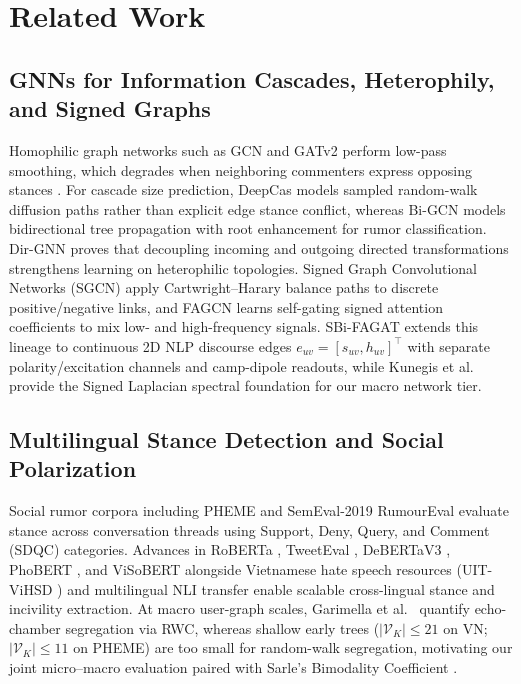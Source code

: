 \documentclass[conference]{IEEEtran}
\begin{document}
\section{Related Work}
\subsection{GNNs for Information Cascades, Heterophily, and Signed Graphs}
Homophilic graph networks such as GCN \cite{kipf2017semisupervised} and GATv2 \cite{brody2022how} perform low-pass smoothing, which degrades when neighboring commenters express opposing stances \cite{platonov2023critical}. For cascade size prediction, DeepCas \cite{li2017deepcas} models sampled random-walk diffusion paths rather than explicit edge stance conflict, whereas Bi-GCN \cite{bian2020rumor} models bidirectional tree propagation with root enhancement for rumor classification. Dir-GNN \cite{rossi2023edge} proves that decoupling incoming and outgoing directed transformations strengthens learning on heterophilic topologies. Signed Graph Convolutional Networks (SGCN) \cite{derr2018signed} apply Cartwright--Harary balance paths \cite{cartwright1956structural} to discrete positive/negative links, and FAGCN \cite{bo2021beyond} learns self-gating signed attention coefficients to mix low- and high-frequency signals. SBi-FAGAT extends this lineage to continuous 2D NLP discourse edges $e_{uv} = [s_{uv}, h_{uv}]^\top$ with separate polarity/excitation channels and camp-dipole readouts, while Kunegis et al.~\cite{kunegis2010spectral} provide the Signed Laplacian spectral foundation for our macro network tier.

\subsection{Multilingual Stance Detection and Social Polarization}
Social rumor corpora including PHEME \cite{zubiaga2016analysing,kochkina2018pheme} and SemEval-2019 RumourEval \cite{gorrell2019semeval} evaluate stance across conversation threads using Support, Deny, Query, and Comment (SDQC) categories. Advances in RoBERTa \cite{liu2019roberta}, TweetEval \cite{barbieri2020tweeteval}, DeBERTaV3 \cite{he2023debertav3}, PhoBERT \cite{nguyen2020phobert}, and ViSoBERT \cite{nguyen2023visobert} alongside Vietnamese hate speech resources (UIT-ViHSD \cite{luu2021vihsd}) and multilingual NLI transfer \cite{laurer2024less} enable scalable cross-lingual stance and incivility extraction. At macro user-graph scales, Garimella et al.~\cite{garimella2016quantifying,garimella2018quantifying} quantify echo-chamber segregation via RWC, whereas shallow early trees ($|\mathcal{V}_K| \le 21$ on VN; $|\mathcal{V}_K| \le 11$ on PHEME) are too small for random-walk segregation, motivating our joint micro--macro evaluation paired with Sarle's Bimodality Coefficient \cite{pfister2013good}.
\end{document}
